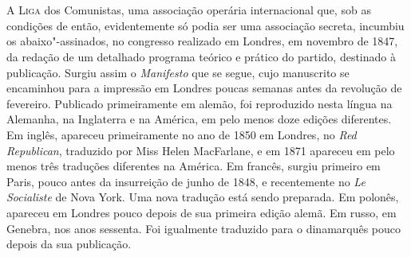 
\part{\titulo}


\textsc{A Liga} dos Comunistas, uma associação operária internacional que, sob as
condições de então, evidentemente só podia ser uma associação secreta,
incumbiu os abaixo"-assinados, no congresso realizado em Londres, em
novembro de 1847, da redação de um detalhado programa teórico e prático
do partido, destinado à publicação. Surgiu assim o \textit{Manifesto}
que se segue, cujo manuscrito se encaminhou para a impressão em Londres
poucas semanas antes da revolução de fevereiro. Publicado primeiramente
em alemão, foi reproduzido nesta língua na Alemanha, na Inglaterra e na
América, em pelo menos doze edições diferentes. Em inglês, apareceu
primeiramente no ano de 1850 em Londres, no \textit{Red Republican},
traduzido por Miss Helen MacFarlane, e em 1871 apareceu em pelo menos
três traduções diferentes na América. Em francês, surgiu primeiro em
Paris, pouco antes da insurreição de junho de 1848, e recentemente no
\textit{Le Socialiste} de Nova York. Uma nova tradução está sendo
preparada. Em polonês, apareceu em Londres pouco depois de sua primeira
edição alemã. Em russo, em Genebra, nos anos sessenta. Foi igualmente
traduzido para o dinamarquês pouco depois da sua publicação.


